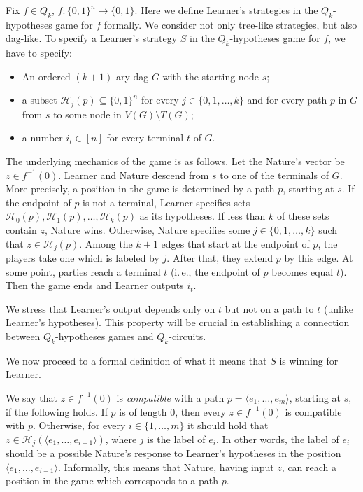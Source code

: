 \documentclass[11pt]{article}
\numberwithin{equation}{section}
\theoremstyle{definition}
\theoremstyle{plain}
\newcommand{\ie}{i.\,e.}
\begin{document}
Fix $f\in Q_k$, $f\colon\{0, 1\}^n\to\{0,1\}$. Here we define Learner's strategies in the $Q_k$-hypotheses game for $f$ formally. We consider not only tree-like strategies, but also dag-like. To specify a Learner's strategy $S$ in the $Q_k$-hypotheses game for $f$, we have to specify:
\begin{itemize}
\item An ordered $(k+1)$-ary dag $G$ with the starting node $s$;
\item a subset $\mathcal{H}_j(p)\subseteq\{0,1\}^n$ for every $j\in\{0, 1, \ldots, k\}$ and for every path $p$ in $G$ from $s$ to some node in $V(G)\setminus T(G)$;
\item a number $i_t\in [n]$ for every terminal $t$ of $G$.
\end{itemize}
The underlying mechanics of the game is as follows. Let the Nature's vector be $z\in f^{-1}(0)$. Learner and Nature descend from $s$ to one of the terminals of $G$. More precisely, a position in the game is determined by a path $p$, starting at $s$. If the endpoint of $p$ is not a terminal, Learner specifies sets $\mathcal{H}_0(p), \mathcal{H}_1(p), \ldots, \mathcal{H}_k(p)$ as its hypotheses.
%
If less than $k$ of these sets contain $z$, Nature wins. Otherwise, Nature specifies some $j\in\{0, 1, \ldots, k\}$ such that $z\in\mathcal{H}_j(p)$. Among the $k+1$ edges that start at the endpoint of $p$, the players take one which is labeled by $j$. After that, they extend $p$ by this edge. At some point, parties reach a terminal $t$ (\ie, the endpoint of $p$ becomes equal $t$). Then the game ends and Learner outputs $i_t$.

We stress that Learner's output depends only on $t$ but not on a path to $t$ (unlike Learner's hypotheses). This property will be crucial in establishing a connection between $Q_k$-hypotheses games and $Q_k$-circuits.

We now proceed to a formal definition of what it means that $S$ is winning for Learner.

We say that $z\in f^{-1}(0)$ is \emph{compatible} with a path $p = \langle e_1, \ldots, e_m\rangle$, starting at $s$, if the following holds. If $p$ is of length $0$, then every $z\in f^{-1}(0)$ is compatible with $p$. Otherwise, for every $i\in\{1, \ldots, m\}$ it should hold that $z\in\mathcal{H}_j(\langle e_1, \ldots, e_{i - 1}\rangle)$, where $j$ is the label of $e_i$. In other words, the label of $e_i$ should be a possible Nature's response to Learner's hypotheses in the position $\langle e_1, \ldots, e_{i - 1}\rangle$.
Informally, this means that Nature, having input $z$, can reach a position in the game which corresponds to a path $p$.
\end{document}
